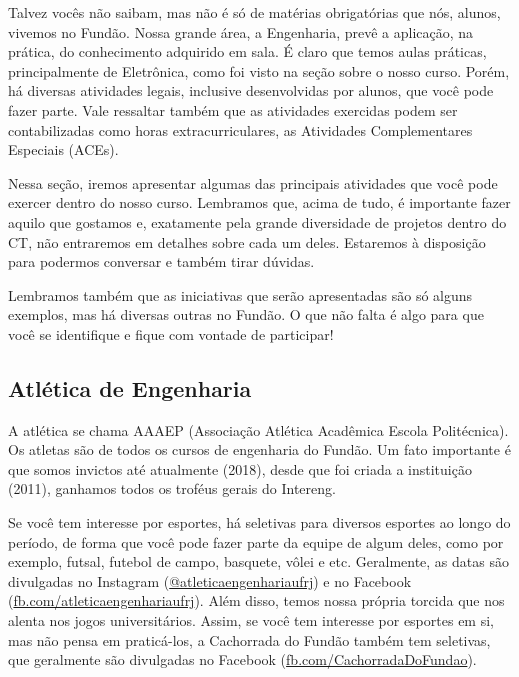 Talvez vocês não saibam, mas não é só de matérias obrigatórias que nós, alunos, vivemos no Fundão. Nossa grande área, a Engenharia, prevê a aplicação, na prática, do conhecimento adquirido em sala. É claro que temos aulas práticas, principalmente de Eletrônica, como foi visto na seção sobre o nosso curso. Porém, há diversas atividades legais, inclusive desenvolvidas por alunos, que você pode fazer parte. Vale ressaltar também que as atividades exercidas podem ser contabilizadas como horas extracurriculares, as Atividades Complementares Especiais (ACEs).

Nessa seção, iremos apresentar algumas das principais atividades que você pode exercer dentro do nosso curso. Lembramos que, acima de tudo, é importante fazer aquilo que gostamos e, exatamente pela grande diversidade de projetos dentro do CT, não entraremos em detalhes sobre cada um deles. Estaremos à disposição para podermos conversar e também tirar dúvidas.

Lembramos também que as iniciativas que serão apresentadas são só alguns exemplos, mas há diversas outras no Fundão. O que não falta é algo para que você se identifique e fique com vontade de participar!

\subsection{Atlética de Engenharia}

A atlética se chama AAAEP (Associação Atlética Acadêmica Escola Politécnica). Os atletas são de todos os cursos de engenharia do Fundão. Um fato importante é que somos invictos até atualmente (2018), desde que foi criada a instituição (2011), ganhamos todos os troféus gerais do Intereng. 

Se você tem interesse por esportes, há seletivas para diversos esportes ao longo do período, de forma que você pode fazer parte da equipe de algum deles, como por exemplo, futsal, futebol de campo, basquete, vôlei e etc. Geralmente, as datas são divulgadas no Instagram (\href{https://www.instagram.com/atleticaengenhariaufrj/}{@atleticaengenhariaufrj}) e no Facebook (\href{https://www.facebook.com/atleticaengenhariaufrj/}{fb.com/atleticaengenhariaufrj}). Além disso, temos nossa própria torcida que nos alenta nos jogos universitários. Assim, se você tem interesse por esportes em si, mas não pensa em praticá-los, a Cachorrada do Fundão também tem seletivas, que geralmente são divulgadas no Facebook (\href{https://www.facebook.com/CachorradaDoFundao/}{fb.com/CachorradaDoFundao}). 

